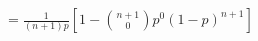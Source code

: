 \documentclass[preview]{standalone}
\begin{document}
\begin{align*}
= \frac{1}{(n+1)p} \left[1 - \binom{n+1}{0} p^0 (1-p)^{n+1}\right]
\end{align*}
\end{document}
